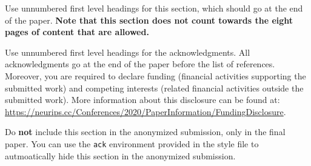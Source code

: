 \documentclass{article}
\theoremstyle{definition}
\begin{document}
Use unnumbered first level headings for this section, which should go at the end of the paper. {\bf Note that this section does not count towards the eight pages of content that are allowed.}

\begin{ack}
Use unnumbered first level headings for the acknowledgments. All acknowledgments
go at the end of the paper before the list of references. Moreover, you are required to declare 
funding (financial activities supporting the submitted work) and competing interests (related financial activities outside the submitted work). 
More information about this disclosure can be found at: \url{https://neurips.cc/Conferences/2020/PaperInformation/FundingDisclosure}.


Do {\bf not} include this section in the anonymized submission, only in the final paper. You can use the \texttt{ack} environment provided in the style file to autmoatically hide this section in the anonymized submission.
\end{ack}

\printbibliography

\newpage


\end{document}
